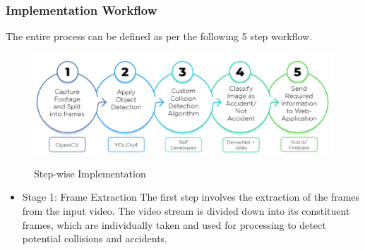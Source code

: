\documentclass[ 12pt,a4paper,twocolumn,fleqn]{article}
\begin{document}
\begin{adjustwidth}{3.5em}{0pt}
\newpage
  \pagestyle{fancy}
  
\subsubsection{Implementation Workflow}

The entire process can be defined as per the following 5 step workflow.

\begin{figure}[H]
\begin{center}
    \hspace*{0.4in}
    \includegraphics[scale=0.3]{media/flow.png}
    \\
  \caption{ Step-wise Implementation  }
\end{center}
\end{figure}

\begin{itemize}
    \item {Stage 1: Frame Extraction
The first step involves the extraction of the frames from the input video. The video stream is divided down into its constituent frames, which are individually taken and used for processing to detect potential collisions and accidents.}


\end{itemize}
\end{adjustwidth}
\end{document}
